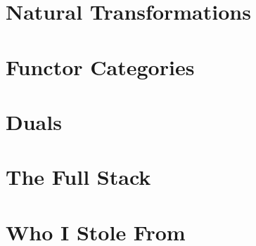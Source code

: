 \documentclass[12pt]{article}
\theoremstyle{definition}
\theoremstyle{definition}
\theoremstyle{definition}
\numberwithin{equation}{section}
\begin{document}
\section{Natural Transformations}

\section{Functor Categories}

\section{Duals}

\section{The Full Stack}

\section{Who I Stole From}
\end{document}
